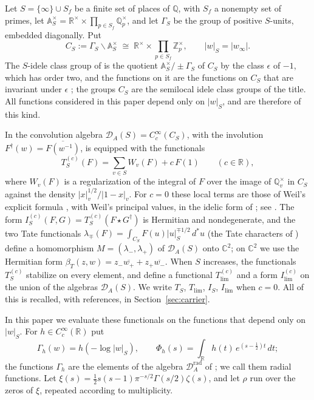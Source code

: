 \documentclass[11pt]{amsart}
\theoremstyle{remark}
\numberwithin{equation}{section}
\newcommand{\C}{\mathbb C}
\newcommand{\R}{\mathbb R}
\newcommand{\Z}{\mathbb Z}
\newcommand{\Q}{\mathbb Q}
\newcommand{\A}{\mathbb A}
\newcommand{\DA}{\mathcal D_A}
\newcommand{\DAr}{\mathcal D_A^{\mathrm{rad}}}
\newcommand{\CS}{C_S}
\newcommand{\Tl}{T_{\lim}}
\newcommand{\Il}{I_{\lim}}
\begin{document}
Let $S=\{\infty\}\cup S_f$ be a finite set of places of $\Q$, with $S_f$ a
nonempty set of primes, let
$\A_S^\times=\R^\times\times\prod_{p\in S_f}\Q_p^\times$, and let $\Gamma_S$
be the group of positive $S$-units, embedded diagonally.  Put
\[
  \CS:=\Gamma_S\backslash\A_S^\times\;\cong\;
  \R^\times\times\prod_{p\in S_f}\Z_p^\times ,\qquad
  |w|_S=|w_\infty| .
\]
The $S$-idele class group of \cite{Connes99,MeyerIdele} is the quotient
$\A_S^\times/\pm\Gamma_S$ of $\CS$ by the class $\epsilon$ of $-1$, which
has order two, and the functions on it are the functions on $\CS$ that are
invariant under $\epsilon$ \cite[Lemma~2.5]{P43}; the groups $\CS$ are the
semilocal idele class groups of the title.  All functions considered
in this paper depend only on $|w|_S$, and are therefore of this kind.

In \cite{P43} the convolution algebra $\DA(S)=C_c^\infty(\CS)$, with the
involution $F^\dagger(w)=\overline{F(w^{-1})}$, is equipped with the
functionals
\[
  T^{(c)}_S(F)=\sum_{v\in S}W_v(F)+c\,F(1)\qquad(c\in\R),
\]
where $W_v(F)$ is a regularization of the integral of $F$ over the image of
$\Q_v^\times$ in $\CS$ against the density $|x|_v^{1/2}/|1-x|_v$.  For $c=0$
these local terms are those of Weil's explicit formula \cite{Weil1952}, with
Weil's principal values, in the idelic form of
\cite[Appendix~II]{Connes99}; see \cite[Section~1]{P43}.  The form
$I^{(c)}_S(F,G)=T^{(c)}_S(F\star G^\dagger)$ is Hermitian and nondegenerate,
and the two Tate functionals
$\lambda_\mp(F)=\int_{\CS}F(u)|u|_S^{\mp1/2}\,d^*u$ (the Tate characters
of \cite[Theorem~5.11]{P43}) define a homomorphism
$M=(\lambda_-,\lambda_+)$ of $\DA(S)$ onto $\C^2$; on $\C^2$ we use the
Hermitian form $\beta_T(z,w)=z_-\overline{w_+}+z_+\overline{w_-}$.  When $S$
increases, the functionals $T^{(c)}_S$ stabilize on every element, and
define a functional $T^{(c)}_{\lim}$ and a form $I^{(c)}_{\lim}$ on the
union of the algebras $\DA(S)$.  We write $T_S$, $\Tl$, $I_S$, $\Il$ when
$c=0$.  All of this is recalled, with references, in
Section~\ref{sec:carrier}.

In this paper we evaluate these functionals on the functions that depend
only on $|w|_S$.  For $h\in C_c^\infty(\R)$ put
\[
  \Gamma_h(w)=h(-\log|w|_S),\qquad
  \Phi_h(s)=\int_\R h(t)\,e^{(s-\frac12)t}\,dt ;
\]
the functions $\Gamma_h$ are the elements of the algebra $\DAr$ of
\cite[Definitions~3.2 and~3.6, Lemma~3.7]{P44}; we call them radial
functions.  Let $\xi(s)=\tfrac12s(s-1)\pi^{-s/2}\Gamma(s/2)\zeta(s)$, and let
$\rho$ run over the zeros of $\xi$, repeated according to multiplicity.
\end{document}
